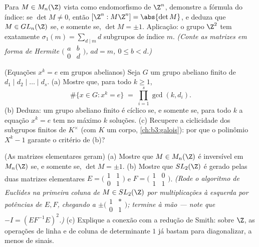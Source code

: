 \begin{exercise}[$\star\star\star$]\label{exo:b3:modules:10}
Para $M \in M_n(\Z)$ vista como endomorfismo de $\Z^n$, demonstre a fórmula
do índice: se $\det M \ne 0$, então $[\Z^n : M\Z^n] = \abs{\det M}$, e deduza que $M \in GL_n(\Z)$ se, e somente se,
$\det M = \pm 1$. Aplicação: o grupo $\Z^2$ tem exatamente $\sigma_1(m) = \sum_{d \mid m} d$ subgrupos de
índice $m$. \emph{(Conte as matrizes em forma de Hermite $\bigl(\begin{smallmatrix}
a & b\\ 0 & d\end{smallmatrix}\bigr)$,
$ad = m$, $0 \leq b <
d$.)}
\end{exercise}

\begin{exercise}[$\star\star$]\label{exo:b3:modules:11}
(Equações $x^k = e$ em grupos abelianos) Seja $G$ um grupo abeliano
finito de  $d_1 \mid d_2 \mid \dots
\mid d_s$.
(a) Mostre que, para todo $k \geq 1$,
\[
\#\{x \in G : x^k = e\} \;=\; \prod_{i=1}^{s}\gcd(k, d_i) .
\]
(b) Deduza: um grupo abeliano finito é cíclico se, e somente se, para
todo $k$ a equação $x^k = e$ tem no máximo $k$ soluções.
(c) Recupere a ciclicidade dos subgrupos finitos de $K^\times$ (com $K$
um corpo, \cref{ch:b3:galois}): por que o polinômio $X^k - 1$ garante o critério
de (b)?
\end{exercise}

\begin{exercise}[$\star\star\star$]\label{exo:b3:modules:12}
(As matrizes elementares geram) (a) Mostre que $M \in M_n(\Z)$ é inversível em
$M_n(\Z)$ se, e somente se, $\det M = \pm1$.
(b) Mostre que $SL_2(\Z)$ é gerado pelas duas matrizes elementares $E = \bigl(\begin{smallmatrix}1 & 1\\ 0 &
1\end{smallmatrix}\bigr)$ e
$F = \bigl(\begin{smallmatrix}1 & 0\\ 1 &
1\end{smallmatrix}\bigr)$. \emph{(Rode o algoritmo de Euclides na primeira coluna de $M
\in SL_2(\Z)$
por multiplicações à esquerda por potências de $E, F$, chegando a
$\pm\bigl(\begin{smallmatrix}1 & *\\ 0 &
1\end{smallmatrix}\bigr)$; termine à mão --- note que $-I = (EF^{-1}E)^2$.)}
(c) Explique a conexão com a redução de Smith: sobre $\Z$, as
operações de linha e de coluna de determinante $1$ já bastam para
diagonalizar, a menos de sinais.
\end{exercise}

